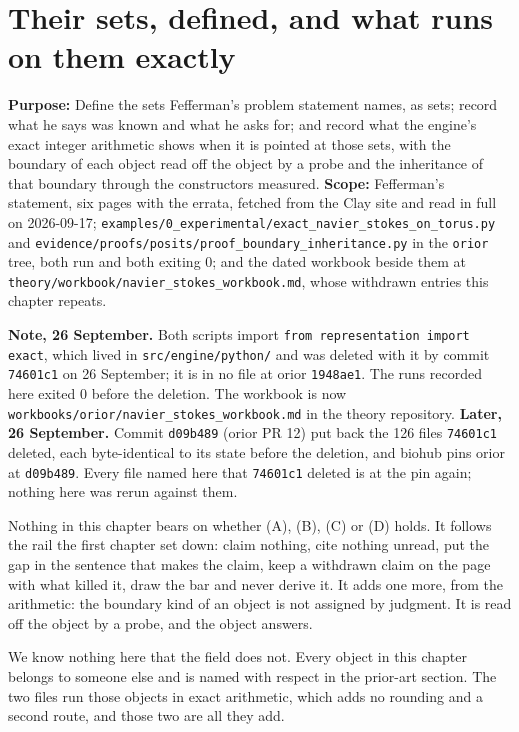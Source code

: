 \chapter{Their sets, defined, and what runs on them exactly}

\textbf{Purpose:} Define the sets Fefferman's problem statement names, as sets; record what he says
was known and what he asks for; and record what the engine's exact integer arithmetic shows when it
is pointed at those sets, with the boundary of each object read off the object by a probe and the
inheritance of that boundary through the constructors measured. \textbf{Scope:} Fefferman's
statement, six pages with the errata, fetched from the Clay site and read in full on 2026-09-17;
\texttt{examples/\allowbreak{}0\_experimental/\allowbreak{}exact\_navier\_stokes\_on\_torus.py}
and \texttt{evidence/\allowbreak{}proofs/\allowbreak{}posits/\allowbreak{}proof\_boundary\_inheritance.py}
in the \texttt{orior} tree, both run and both exiting 0; and the dated workbook beside them at
\texttt{theory/\allowbreak{}workbook/\allowbreak{}navier\_stokes\_workbook.md}, whose withdrawn
entries this chapter repeats.

\textbf{Note, 26 September.} Both scripts import \texttt{from representation import exact}, which lived
in \texttt{src/\allowbreak{}engine/\allowbreak{}python/} and was deleted with it by commit
\texttt{74601c1} on 26 September; it is in no file at orior \texttt{1948ae1}. The runs recorded
here exited 0 before the deletion. The workbook is now
\texttt{workbooks/\allowbreak{}orior/\allowbreak{}navier\_stokes\_workbook.md} in the theory
repository. \textbf{Later, 26 September.} Commit \texttt{d09b489} (orior PR 12) put back
the 126 files \texttt{74601c1} deleted, each byte-identical to its state before the deletion, and
biohub pins orior at \texttt{d09b489}. Every file named here that \texttt{74601c1} deleted is
at the pin again; nothing here was rerun against them.

Nothing in this chapter bears on whether (A), (B), (C) or (D) holds. It follows the rail the first
chapter set down: claim nothing, cite nothing unread, put the gap in the sentence that makes the
claim, keep a withdrawn claim on the page with what killed it, draw the bar and never derive it. It
adds one more, from the arithmetic: the boundary kind of an object is not assigned by judgment. It is
read off the object by a probe, and the object answers.

We know nothing here that the field does not. Every object in this chapter belongs to someone else
and is named with respect in the prior-art section. The two files run those objects in exact
arithmetic, which adds no rounding and a second route, and those two are all they add.

